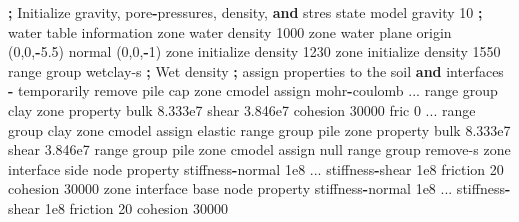 \documentclass[a4paper, nobind]{templates/ociamthesis}
\newenvironment{Shaded}{\begin{snugshade}}{\end{snugshade}}
\newcommand{\BuiltInTok}[1]{#1}
\newcommand{\DecValTok}[1]{\textcolor[rgb]{0.00,0.00,0.81}{#1}}
\newcommand{\FloatTok}[1]{\textcolor[rgb]{0.00,0.00,0.81}{#1}}
\newcommand{\KeywordTok}[1]{\textcolor[rgb]{0.13,0.29,0.53}{\textbf{#1}}}
\newcommand{\NormalTok}[1]{#1}
\newcommand{\OperatorTok}[1]{\textcolor[rgb]{0.81,0.36,0.00}{\textbf{#1}}}
\newcommand{\StringTok}[1]{\textcolor[rgb]{0.31,0.60,0.02}{#1}}
\renewenvironment{Shaded}
{
  \vspace{10pt}%
  \begin{snugshade}%
}{%
  \end{snugshade}%
  \vspace{8pt}%
}
\begin{document}
\begin{Shaded}
\begin{Highlighting}[]
\OperatorTok{;}\NormalTok{ Initialize gravity, pore}\OperatorTok{{-}}\NormalTok{pressures, density, }\KeywordTok{and}\NormalTok{ stres state}
\NormalTok{model gravity }\DecValTok{10}
\OperatorTok{;}\NormalTok{ water table information}
\NormalTok{zone water density }\DecValTok{1000}
\NormalTok{zone water plane origin (}\DecValTok{0}\NormalTok{,}\DecValTok{0}\NormalTok{,}\OperatorTok{{-}}\FloatTok{5.5}\NormalTok{) normal (}\DecValTok{0}\NormalTok{,}\DecValTok{0}\NormalTok{,}\OperatorTok{{-}}\DecValTok{1}\NormalTok{)}
\NormalTok{zone initialize density }\DecValTok{1230}
\NormalTok{zone initialize density }\DecValTok{1550} \BuiltInTok{range}\NormalTok{ group }\StringTok{\textquotesingle{}wetclay{-}s\textquotesingle{}} \OperatorTok{;}\NormalTok{ Wet density}
\OperatorTok{;}\NormalTok{ assign properties to the soil }\KeywordTok{and}\NormalTok{ interfaces }\OperatorTok{{-}}\NormalTok{ temporarily remove pile cap}
\NormalTok{zone cmodel assign mohr}\OperatorTok{{-}}\NormalTok{coulomb ...}
     \BuiltInTok{range}\NormalTok{ group }\StringTok{\textquotesingle{}clay\textquotesingle{}}
\NormalTok{zone }\BuiltInTok{property}\NormalTok{ bulk }\FloatTok{8.333e7}\NormalTok{  shear }\FloatTok{3.846e7}\NormalTok{  cohesion }\DecValTok{30000}\NormalTok{ fric }\DecValTok{0}\NormalTok{ ...}
     \BuiltInTok{range}\NormalTok{ group }\StringTok{\textquotesingle{}clay\textquotesingle{}}
\NormalTok{zone cmodel assign elastic                 }\BuiltInTok{range}\NormalTok{ group }\StringTok{\textquotesingle{}pile\textquotesingle{}}
\NormalTok{zone }\BuiltInTok{property}\NormalTok{ bulk }\FloatTok{8.333e7}\NormalTok{  shear }\FloatTok{3.846e7}  \BuiltInTok{range}\NormalTok{ group }\StringTok{\textquotesingle{}pile\textquotesingle{}}
\NormalTok{zone cmodel assign null                    }\BuiltInTok{range}\NormalTok{ group }\StringTok{\textquotesingle{}remove{-}s\textquotesingle{}}
\NormalTok{zone interface }\StringTok{\textquotesingle{}side\textquotesingle{}}\NormalTok{ node }\BuiltInTok{property}\NormalTok{ stiffness}\OperatorTok{{-}}\NormalTok{normal }\FloatTok{1e8}\NormalTok{ ...}
\NormalTok{                           stiffness}\OperatorTok{{-}}\NormalTok{shear }\FloatTok{1e8}\NormalTok{ friction }\DecValTok{20}\NormalTok{ cohesion }\DecValTok{30000}
\NormalTok{zone interface }\StringTok{\textquotesingle{}base\textquotesingle{}}\NormalTok{ node }\BuiltInTok{property}\NormalTok{ stiffness}\OperatorTok{{-}}\NormalTok{normal }\FloatTok{1e8}\NormalTok{ ...}
\NormalTok{                           stiffness}\OperatorTok{{-}}\NormalTok{shear }\FloatTok{1e8}\NormalTok{ friction }\DecValTok{20}\NormalTok{ cohesion }\DecValTok{30000}
\end{Highlighting}
\end{Shaded}
\end{document}
